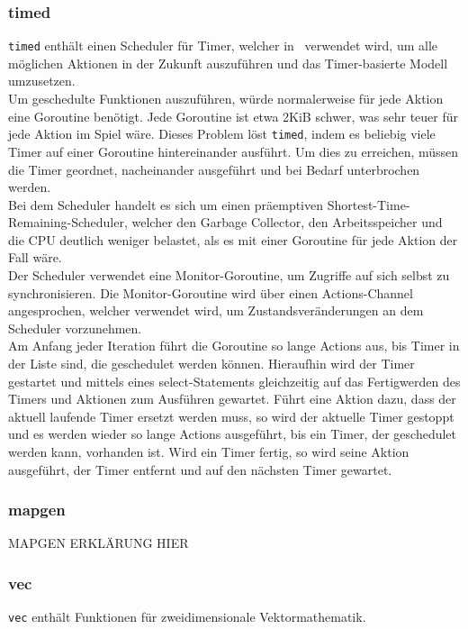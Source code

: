 \subsubsection{timed}
\verb+timed+ enthält einen Scheduler für Timer, welcher in \vires\ verwendet wird, um alle möglichen Aktionen in der Zukunft auszuführen und das Timer-basierte Modell umzusetzen. \\
Um geschedulte Funktionen auszuführen, würde normalerweise für jede Aktion eine Goroutine benötigt. Jede Goroutine ist etwa 2KiB schwer, was sehr teuer für jede Aktion im Spiel wäre. Dieses Problem löst \verb+timed+, indem es beliebig viele Timer auf einer Goroutine hintereinander ausführt. Um dies zu erreichen, müssen die Timer geordnet, nacheinander ausgeführt und bei Bedarf unterbrochen werden. \\
Bei dem Scheduler handelt es sich um einen präemptiven Shortest-Time-Remaining-Scheduler, welcher den Garbage Collector, den Arbeitsspeicher und die CPU deutlich weniger belastet, als es mit einer Goroutine für jede Aktion der Fall wäre. \\
Der Scheduler verwendet eine Monitor-Goroutine, um Zugriffe auf sich selbst zu synchronisieren. Die Monitor-Goroutine wird über einen Actions-Channel angesprochen, welcher verwendet wird, um Zustandsveränderungen an dem Scheduler vorzunehmen. \\
Am Anfang jeder Iteration führt die Goroutine so lange Actions aus, bis Timer in der Liste sind, die geschedulet werden können. Hieraufhin wird der Timer gestartet und mittels eines select-Statements gleichzeitig auf das Fertigwerden des Timers und Aktionen zum Ausführen gewartet. Führt eine Aktion dazu, dass der aktuell laufende Timer ersetzt werden muss, so wird der aktuelle Timer gestoppt und es werden wieder so lange Actions ausgeführt, bis ein Timer, der geschedulet werden kann, vorhanden ist. Wird ein Timer fertig, so wird seine Aktion ausgeführt, der Timer entfernt und auf den nächsten Timer gewartet.

\subsubsection{mapgen}
MAPGEN ERKLÄRUNG HIER

\subsubsection{vec}
\verb+vec+ enthält Funktionen für zweidimensionale Vektormathematik.